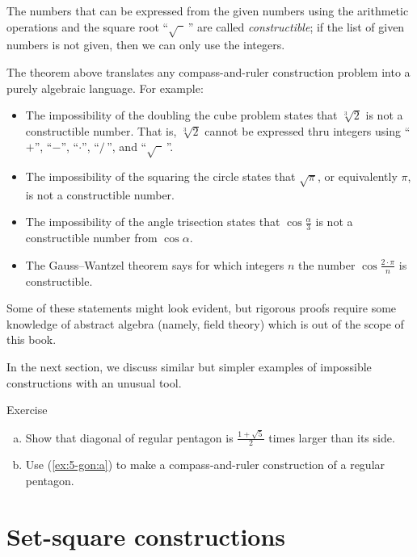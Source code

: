 The numbers that can be expressed from the given numbers using the arithmetic operations and the square root ``$\sqrt{\phantom{a}}\,$'' are called \emph{constructible};
if the list of given numbers is not given, then we can only use the integers.

{\sloppy
The theorem above translates any compass-and-ruler construction problem into a purely algebraic language.
For example:
\begin{itemize}
\item The impossibility of the doubling the cube problem states that $\sqrt[3]{2}$ is not a constructible number.
That is, $\sqrt[3]{2}$ cannot be expressed thru integers using
``$+$'', ``$-$'', ``$\cdot$'', ``$/\,$'', and ``$\sqrt{\phantom{a}}\,$''.

\item The impossibility of the squaring the circle states that 
$\sqrt{\pi}$, or equivalently $\pi$, is not a constructible number.

\item The impossibility of the angle trisection states that $\cos\tfrac\alpha3$ is not a constructible number from $\cos\alpha$.

\item The Gauss--Wantzel theorem says for which integers $n$ the number 
$\cos\tfrac{2\cdot\pi}n$ is constructible.
\end{itemize} 
Some of these statements might look evident, 
but rigorous proofs require some knowledge of abstract algebra (namely, field theory)
which is out of the scope of this book. 

}

In the next section, we discuss similar but simpler examples of impossible constructions with an unusual tool.

\begin{thm}{Exercise}\label{ex:5-gon}
\begin{enumerate}[(a)]
 \item\label{ex:5-gon:a} Show that diagonal of regular pentagon is $\tfrac{1+\sqrt5}2$ times larger than its side.
 \item\label{ex:5-gon:b} Use (\ref{ex:5-gon:a}) to make a compass-and-ruler construction of a regular pentagon.
\end{enumerate}
\end{thm}

\section{Set-square constructions}

